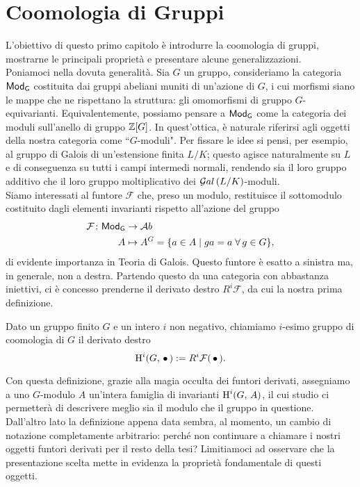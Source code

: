 \chapter{Coomologia di Gruppi}


L'obiettivo di questo primo capitolo è introdurre la coomologia di gruppi, mostrarne le principali proprietà e presentare alcune generalizzazioni.\\

Poniamoci nella dovuta generalità. Sia $ G $ un gruppo, consideriamo la categoria $ \mathsf{Mod}_\mathsf{G} $ costituita dai gruppi abeliani muniti di un'azione di $ G $, i cui morfismi siano le mappe che ne rispettano la struttura: gli omomorfismi di gruppo $ G $-equivarianti. Equivalentemente, possiamo pensare a $ \mathsf{Mod}_\mathsf{G} $ come la categoria dei moduli sull'anello di gruppo $ \mathbb{Z}[G] $. In quest'ottica, è naturale riferirsi agli oggetti della nostra categoria come \textquotedblleft$ G $-moduli".
Per fissare le idee si pensi, per esempio, al gruppo di Galois di un'estensione finita $ L/K $; questo agisce naturalmente su $ L $ e di conseguenza su tutti i campi intermedi normali, rendendo sia il loro gruppo additivo che il loro gruppo moltiplicativo dei $ \mathcal{G}al\left( L/K \right) $-moduli. \\

Siamo interessati al funtore $ \mathcal{F} $ che, preso un modulo, restituisce il sottomodulo costituito dagli elementi invarianti rispetto all'azione del gruppo
\begin{align*} 
\mathcal{F} \colon \mathsf{Mod}_\mathsf{G} &\to \mathcal{A}b \\
A &\mapsto A^G = \{ a \in A \mid ga = a \; \forall \, g \in G \},
\end{align*}
di evidente importanza in Teoria di Galois. Questo funtore è esatto a sinistra ma, in generale, non a destra. Partendo questo da una categoria con abbastanza iniettivi, ci è concesso prenderne il derivato destro $ R^i\mathcal{F} $, da cui la nostra prima definizione.

\begin{definition}
	Dato un gruppo finito $ G $ e un intero $ i $ non negativo, chiamiamo $ i $-esimo gruppo di coomologia di $ G $ il derivato destro
	\[ \operatorname{H}^i(G, \, \bullet\,) : = R^i\mathcal{F}(\,\bullet\,). \]
\end{definition}

Con questa definizione, grazie alla magia occulta dei funtori derivati, assegniamo a uno $ G $-modulo $ A $ un'intera famiglia di invarianti $ \operatorname{H}^i(G, \, A) $, il cui studio ci permetterà di descrivere meglio sia il modulo che il gruppo in questione. Dall'altro lato la definizione appena data sembra, al momento, un cambio di notazione completamente arbitrario: perché non continuare a chiamare i nostri oggetti funtori derivati per il resto della tesi? Limitiamoci ad osservare che la presentazione scelta mette in evidenza la proprietà fondamentale di questi oggetti.

